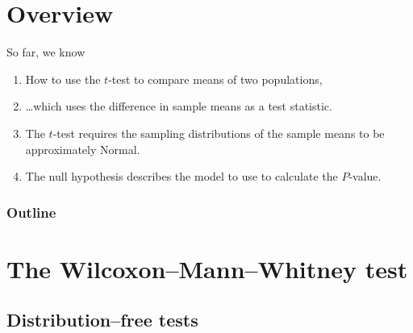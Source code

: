 %
%
%



\subtitle{and nonparametric testing}

\date{29 October 2013}





\begin{frame}
  \maketitle
\end{frame}


\section*{Overview}

\begin{frame}{So far, we know}
  \begin{enumerate}
    \item How to use the $t$-test to compare means of two populations,
    \item \ldots which uses the difference in sample means as a test statistic.
    \item The $t$-test requires the sampling distributions of the sample means to be approximately Normal.
    \item The null hypothesis describes the model to use to calculate the $P$-value.
  \end{enumerate}
\end{frame}

\begin{frame}\frametitle<presentation>{Outline}
  \tableofcontents
\end{frame}



\section{The Wilcoxon--Mann--Whitney test}

\subsection{Distribution--free tests}

